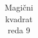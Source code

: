 \documentclass[a4paper,12pt]{article}
\theoremstyle{definition}
\theoremstyle{plain}
\newenvironment{magic}[3]{%
    \begin{table}[ht]
    \centering
    \caption{#2}
    \label{#3}
    \begin{tabular}{|*{#1}{c|}} %
    \hline
}{%
    \hline
    \end{tabular}
    \end{table}
}
\begin{document}
\begin{magic}{9}{Magični kvadrat reda 9}{table:mag9}
\end{magic}



\newpage


\end{document}
